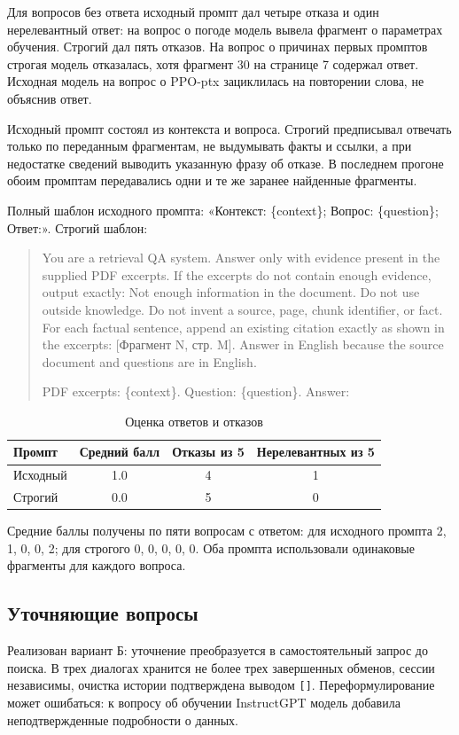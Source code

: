 \documentclass[12pt,a4paper]{article}
\begin{document}
Для вопросов без ответа исходный промпт дал четыре отказа и один нерелевантный ответ: на вопрос о погоде модель вывела фрагмент о параметрах обучения. Строгий дал пять отказов. На вопрос о причинах первых промптов строгая модель отказалась, хотя фрагмент 30 на странице 7 содержал ответ. Исходная модель на вопрос о PPO-ptx зациклилась на повторении слова, не объяснив ответ.

Исходный промпт состоял из контекста и вопроса. Строгий предписывал отвечать только по переданным фрагментам, не выдумывать факты и ссылки, а при недостатке сведений выводить указанную фразу об отказе. В последнем прогоне обоим промптам передавались одни и те же заранее найденные фрагменты.

Полный шаблон исходного промпта: «Контекст: \{context\}; Вопрос: \{question\}; Ответ:». Строгий шаблон:
\begin{quote}\small
You are a retrieval QA system. Answer only with evidence present in the supplied PDF excerpts. If the excerpts do not contain enough evidence, output exactly: Not enough information in the document. Do not use outside knowledge. Do not invent a source, page, chunk identifier, or fact. For each factual sentence, append an existing citation exactly as shown in the excerpts: [Фрагмент N, стр. M]. Answer in English because the source document and questions are in English.

PDF excerpts: \{context\}. Question: \{question\}. Answer:
\end{quote}
\begin{table}[H]\centering\caption{Оценка ответов и отказов}\begin{tabular}{lccc}\toprule Промпт&Средний балл&Отказы из 5&Нерелевантных из 5\\\midrule Исходный&1.0&4&1\\Строгий&0.0&5&0\\\bottomrule\end{tabular}\end{table}
Средние баллы получены по пяти вопросам с ответом: для исходного промпта 2, 1, 0, 0, 2; для строгого 0, 0, 0, 0, 0. Оба промпта использовали одинаковые фрагменты для каждого вопроса.

\subsection{Уточняющие вопросы}
Реализован вариант Б: уточнение преобразуется в самостоятельный запрос до поиска. В трех диалогах хранится не более трех завершенных обменов, сессии независимы, очистка истории подтверждена выводом \texttt{[]}. Переформулирование может ошибаться: к вопросу об обучении InstructGPT модель добавила неподтвержденные подробности о данных.
\end{document}
